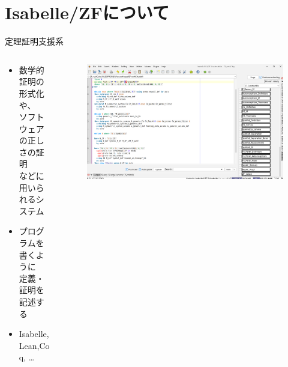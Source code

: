 \documentclass[17pt]{beamer}
\begin{document}
\section{Isabelle/ZFについて}

\begin{frame}{定理証明支援系}
    \begin{columns}
        \begin{column}{0.65\textwidth}
            {\small
            \begin{itemize}[itemsep=7pt]
                \item 数学的証明の形式化や、\\ソフトウェアの正しさの証明\\などに用いられるシステム
                \item プログラムを書くように\\定義・証明を記述する
                \item Isabelle,Lean,Coq, \ldots
            \end{itemize}
            }
        \end{column}
        \begin{column}{0.35\textwidth}
            \begin{figure}
                \includegraphics[width=1.0\linewidth]{./images/isabelle_editor.png}
            \end{figure}
            \vspace{-10pt}
            \begin{columns}
                \begin{column}{0.4\textwidth}

\end{column}
\end{columns}
\end{column}
\end{columns}
\end{frame}
\end{document}
